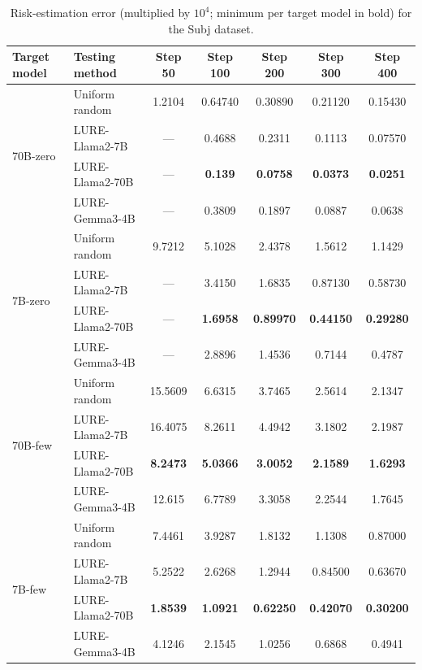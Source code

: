 \begin{table}[h]
    \centering
    \small
    \begin{tabular}{l l c c c c c}
        \toprule
        Target model & Testing method & Step 50 & Step 100 & Step 200 & Step 300 & Step 400 \\
        \midrule
        \multirow{4}{*}{70B-zero}& Uniform random & 1.2104    &  0.64740    &  0.30890    &  0.21120    &  0.15430 \\
        &LURE-Llama2-7B & --- & 0.4688   & 0.2311   &  0.1113   &   0.07570 \\
        & LURE-Llama2-70B & --- & \textbf{0.139  } &  \textbf{0.0758}   & \textbf{0.0373 }  &  \textbf{0.0251} \\
        &LURE-Gemma3-4B & --- & 0.3809& 0.1897& 0.0887& 0.0638\\
        \hline
        \multirow{4}{*}{7B-zero}& Uniform random& 9.7212 &  5.1028& 2.4378 &  1.5612 &  1.1429 \\
        & LURE-Llama2-7B & --- & 3.4150  &  1.6835   & 0.87130   & 0.58730 \\
        &LURE-Llama2-70B &--- &\textbf{1.6958 } &  \textbf{0.89970 } & \textbf{ 0.44150}  &  \textbf{0.29280} \\
        &LURE-Gemma3-4B & --- & 2.8896& 1.4536& 0.7144& 0.4787\\
        \hline
        \multirow{4}{*}{70B-few}& Uniform random & 15.5609 &  6.6315  & 3.7465 &  2.5614 &  2.1347 \\
        & LURE-Llama2-7B &16.4075 &  8.2611 &  4.4942 &  3.1802 &  2.1987 \\
        & LURE-Llama2-70B & \textbf{8.2473 } &  \textbf{5.0366} &   \textbf{3.0052} &  \textbf{ 2.1589} &  \textbf{ 1.6293} \\
        &LURE-Gemma3-4B & 12.615 & 6.7789& 3.3058& 2.2544 & 1.7645\\
        \hline
        \multirow{4}{*}{7B-few}&Uniform random & 7.4461   & 3.9287   & 1.8132  &  1.1308   & 0.87000 \\
        & LURE-Llama2-7B &5.2522   & 2.6268  &  1.2944   & 0.84500   & 0.63670 \\
        & LURE-Llama2-70B & \textbf{1.8539}   & \textbf{1.0921}  &  \textbf{0.62250 } &  \textbf{0.42070}  &  \textbf{0.30200} \\
        &LURE-Gemma3-4B & 4.1246& 2.1545& 1.0256& 0.6868 & 0.4941\\
        \hline
    \end{tabular}
    \vspace{1em}
    \caption{
        Risk-estimation error (multiplied by $10^4$; minimum per target model in bold) for the Subj dataset.
    }
    \label{tab:3}
\end{table}


